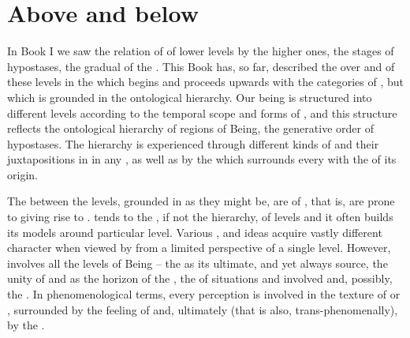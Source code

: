 \section{Above and below}
In Book I we saw the relation of  of lower levels by
the higher ones, the stages of hypostases, the gradual  of the
 .  This Book has, so far, described the
 over and of these levels in the  which
begins and proceeds upwards with the categories of ,
but which is grounded in the ontological hierarchy.  Our being is structured
into different levels according to the temporal scope and forms of
, and this structure reflects the ontological hierarchy of
regions of Being, the generative order of hypostases.  The hierarchy is
experienced through different kinds of  and their juxtapositions in in
any , as well as by the  which surrounds every
 with the  of its origin.


The  between the levels, grounded in  as they
might be, are  of , that is, are prone to giving
rise to .   tends to 
the , if not the hierarchy, of levels and it often builds its
models around particular level.  Various ,  and ideas
acquire vastly different character when viewed by  from a limited
perspective of a single level.
However,  involves all the levels of Being -- the  as
its ultimate,  and  yet always  source, the
unity of  and  as the horizon of the , the 
 of  situations and involved  and,
possibly, the  .  In phenomenological terms, every
 perception is involved in the texture of   or
, surrounded by the feeling of  and, ultimately (that
is also, trans-phenomenally), by the  .

